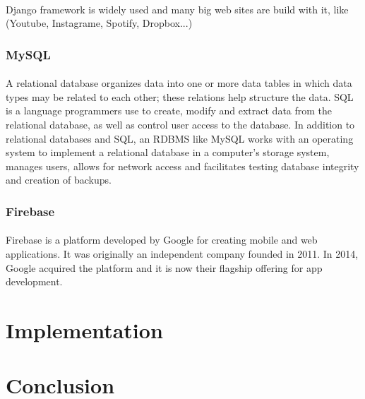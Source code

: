 \documentclass{article}
\begin{document}
	\paragraph{}
	Django framework is widely used and many big web sites are build with it, like (Youtube, Instagrame, Spotify, Dropbox...)
	\subsubsection{MySQL}
	\paragraph{}
	 A relational database organizes data into one or more data tables in which data types may be related to each other; these relations help structure the data. SQL is a language programmers use to create, modify and extract data from the relational database, as well as control user access to the database. In addition to relational databases and SQL, an RDBMS like MySQL works with an operating system to implement a relational database in a computer's storage system, manages users, allows for network access and facilitates testing database integrity and creation of backups.
	\subsubsection{Firebase}
	\paragraph{}
	Firebase is a platform developed by Google for creating mobile and web applications. It was originally an independent company founded in 2011. In 2014, Google acquired the platform and it is now their flagship offering for app development.
	\section{Implementation}
	\section{Conclusion}
	\newpage
\end{document}
